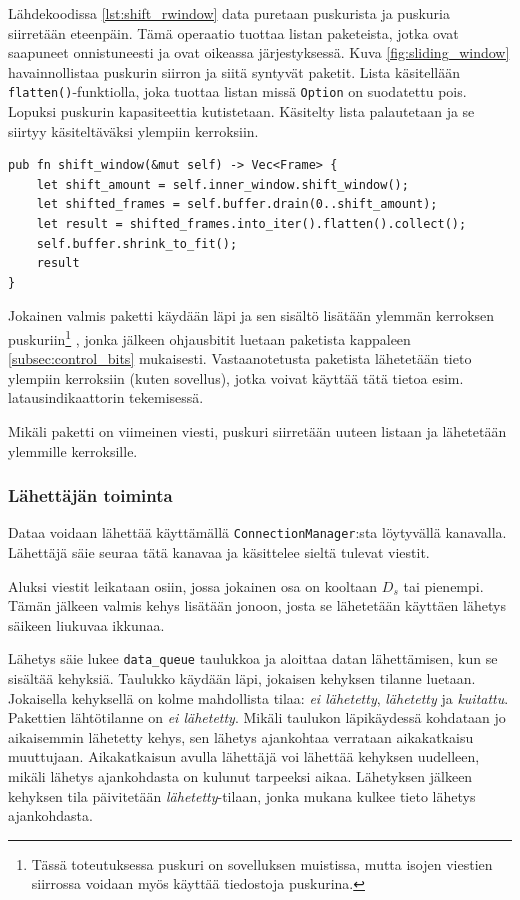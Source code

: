 \documentclass[a4paper,12pt]{article}
\begin{document}
    Lähdekoodissa \ref{lst:shift_rwindow} data puretaan puskurista ja puskuria siirretään eteenpäin. Tämä operaatio tuottaa
    listan paketeista, jotka ovat saapuneet onnistuneesti ja ovat oikeassa järjestyksessä. Kuva \ref{fig:sliding_window} havainnollistaa puskurin siirron ja siitä syntyvät paketit.
    Lista käsitellään \lstinline{flatten()}-funktiolla, joka tuottaa listan missä \lstinline{Option}
    on suodatettu pois. Lopuksi puskurin kapasiteettia kutistetaan. Käsitelty lista palautetaan ja se siirtyy käsiteltäväksi ylempiin kerroksiin. \par


    \begin{lstlisting}[caption={Datan purkaminen puskurista}, label={lst:shift_rwindow}]
pub fn shift_window(&mut self) -> Vec<Frame> {
    let shift_amount = self.inner_window.shift_window();
    let shifted_frames = self.buffer.drain(0..shift_amount);
    let result = shifted_frames.into_iter().flatten().collect();
    self.buffer.shrink_to_fit();
    result
}\end{lstlisting}

    Jokainen valmis paketti käydään läpi ja sen sisältö lisätään ylemmän kerroksen puskuriin\footnote{Tässä toteutuksessa puskuri on sovelluksen muistissa, mutta isojen viestien siirrossa voidaan myös käyttää tiedostoja puskurina.}
    , jonka jälkeen ohjausbitit luetaan paketista kappaleen \ref{subsec:control_bits} mukaisesti. Vastaanotetusta paketista lähetetään tieto ylempiin kerroksiin (kuten sovellus), jotka voivat käyttää tätä tietoa esim. latausindikaattorin tekemisessä. \par

    Mikäli paketti on viimeinen viesti, puskuri siirretään uuteen listaan ja lähetetään ylemmille kerroksille.

    \subsubsection{Lähettäjän toiminta}\label{subsec:sender_impl}
    Dataa voidaan lähettää käyttämällä \lstinline{ConnectionManager}:sta löytyvällä kanavalla. Lähettäjä säie seuraa tätä kanavaa ja käsittelee sieltä tulevat viestit. \par

    Aluksi viestit leikataan osiin, jossa jokainen osa on kooltaan $D_s$ tai pienempi. Tämän jälkeen valmis kehys lisätään jonoon, josta se lähetetään käyttäen lähetys säikeen liukuvaa ikkunaa.
 
Lähetys säie lukee \lstinline{data_queue} taulukkoa ja aloittaa datan lähettämisen, kun se sisältää kehyksiä. Taulukko käydään läpi, jokaisen kehyksen tilanne luetaan. Jokaisella kehyksellä on kolme mahdollista tilaa: \textit{ei lähetetty}, \textit{lähetetty} ja \textit{kuitattu}. Pakettien lähtötilanne on \textit{ei lähetetty}. Mikäli taulukon läpikäydessä kohdataan jo aikaisemmin lähetetty kehys, sen lähetys ajankohtaa verrataan aikakatkaisu muuttujaan. Aikakatkaisun avulla lähettäjä voi lähettää kehyksen uudelleen, mikäli lähetys ajankohdasta on kulunut tarpeeksi aikaa. Lähetyksen jälkeen kehyksen tila päivitetään \textit{lähetetty}-tilaan, jonka mukana kulkee tieto lähetys ajankohdasta. \par
\end{document}
